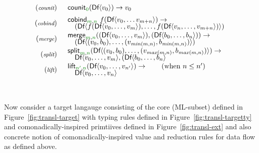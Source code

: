 \begin{equation*}
\begin{array}{rl}
{\footnotesize(\emph{counit})} & \begin{array}{l}
\ident{counit}_{\cclrd{0}}(\ident{Df} \langle v_0 \rangle)   \rightarrow v_0
\end{array}
\\[0.5em]
{\footnotesize(\emph{cobind})} & \begin{array}{l}
\ident{cobind}_{\cclrd{m}, \cclrd{n}}~f (\ident{Df}\langle v_0, \ldots v_{m+n} \rangle) \rightarrow
\\[-0.25em]
\quad (\ident{Df}\langle f (\ident{Df}\langle v_0, \ldots, v_m \rangle), \ldots, f (\ident{Df}\langle v_{n}, \ldots, v_{m+n} \rangle) \rangle)
\end{array}
\\[0.5em]
{\footnotesize(\emph{merge})} & \begin{array}{l}
\ident{merge}_{\cclrd{m}, \cclrd{n}} ((\ident{Df}\langle v_0, \ldots, v_m \rangle), (\ident{Df}\langle b_0, \ldots, b_n\rangle)) \rightarrow
\\[-0.25em]
\quad (\ident{Df}\langle (v_0, b_0), \ldots, (v_{\mathit{min}(m,n)}, b_{\mathit{min}(m,n)}) \rangle)
\end{array}
\\[0.5em]
{\footnotesize(\emph{split})} & \begin{array}{l}
\ident{split}_{\cclrd{m}, \cclrd{n}} (\ident{Df}\langle (v_0, b_0), \ldots, (v_{\mathit{max}(m,n)}, b_{\mathit{max}(m,n)}) \rangle)  \rightarrow
\\[-0.25em]
\quad \ident{Df}\langle v_0, \ldots, v_m \rangle, (\ident{Df}\langle b_0, \ldots, b_n\rangle
\end{array}
\\[0.5em]
{\footnotesize(\emph{lift})} & \begin{array}{l}
\ident{lift}_{\cclrd{n'}, \cclrd{n}} (\ident{Df}\langle v_0, \ldots, v_{n'} \rangle) \rightarrow
\qquad(\textnormal{when}~n\leq n') \\[-0.25em]
\quad \ident{Df}\langle v_0, \ldots, v_n \rangle
\end{array}
\end{array}
\end{equation*}

~

\noindent
Now consider a target langauge consisting of the core (ML-subset) defined in Figure~\ref{fig:transl-target}
with typing rules defined in Figure~\ref{fig:transl-targetty} and comonadically-inspired primtiives
defined in Figure~\ref{fig:transl-ext} and also concrete notion of comonadically-inspired value
and reduction rules for data flow as defined above.


